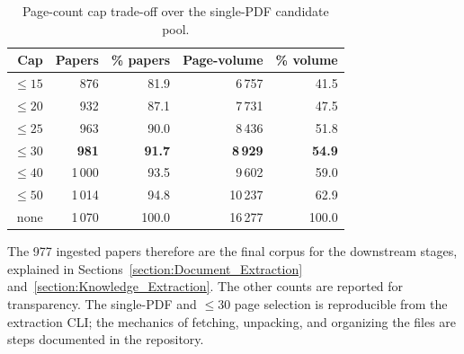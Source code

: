 \begin{table}[t]
  \centering
  \caption[Page-count cap trade-off]{Page-count cap trade-off over the single-PDF candidate pool.}
  \label{tab:page-cap-tradeoff}
  \begin{tabular}{@{}r r r r r@{}}
    \toprule
    Cap & Papers & \% papers & Page-volume & \% volume \\
    \midrule
    $\le 15$ & 876 & 81.9 & 6\,757 & 41.5 \\
    $\le 20$ & 932 & 87.1 & 7\,731 & 47.5 \\
    $\le 25$ & 963 & 90.0 & 8\,436 & 51.8 \\
    \textbf{$\le 30$} & \textbf{981} & \textbf{91.7} & \textbf{8\,929} & \textbf{54.9} \\
    $\le 40$ & 1\,000 & 93.5 & 9\,602 & 59.0 \\
    $\le 50$ & 1\,014 & 94.8 & 10\,237 & 62.9 \\
    none & 1\,070 & 100.0 & 16\,277 & 100.0 \\
    \bottomrule
  \end{tabular}
\end{table}

The 977 ingested papers therefore are the final corpus for the downstream stages, explained in Sections~\ref{section:Document_Extraction} and~\ref{section:Knowledge_Extraction}. The other counts are reported for transparency. The single-PDF and \(\leq 30\) page selection is reproducible from the extraction CLI; the mechanics of fetching, unpacking, and organizing the files are steps documented in the repository.